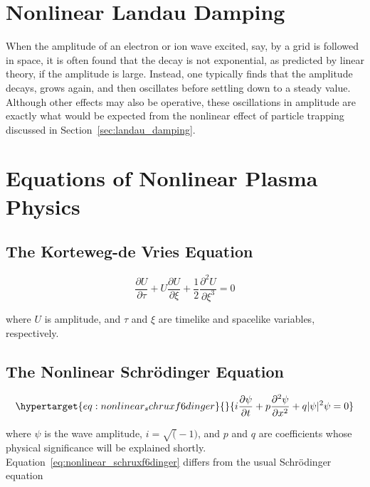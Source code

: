 \documentclass[
  notoc %
]{tufte-book}
\begin{document}
\hypertarget{nonlinear-landau-damping}{%
\section{Nonlinear Landau Damping}\label{nonlinear-landau-damping}}

When the amplitude of an electron or ion wave excited, say, by a grid is
followed in space, it is often found that the decay is not exponential,
as predicted by linear theory, if the amplitude is large. Instead, one
typically finds that the amplitude decays, grows again, and then
oscillates before settling down to a steady value. Although other
effects may also be operative, these oscillations in amplitude are
exactly what would be expected from the nonlinear effect of particle
trapping discussed in Section~\ref{sec:landau_damping}.

\hypertarget{equations-of-nonlinear-plasma-physics}{%
\section{Equations of Nonlinear Plasma
Physics}\label{equations-of-nonlinear-plasma-physics}}

\hypertarget{the-korteweg-de-vries-equation}{%
\subsection{The Korteweg-de Vries
Equation}\label{the-korteweg-de-vries-equation}}

\[
\frac{\partial U}{\partial\tau} + U\frac{\partial U}{\partial\xi}+\frac{1}{2}\frac{\partial^2 U}{\partial\xi^3} = 0
\]

where \(U\) is amplitude, and \(\tau\) and \(\xi\) are timelike and
spacelike variables, respectively.

\hypertarget{the-nonlinear-schruxf6dinger-equation}{%
\subsection{The Nonlinear Schrödinger
Equation}\label{the-nonlinear-schruxf6dinger-equation}}

\begin{equation}\protect\hypertarget{eq:nonlinear_schruxf6dinger}{}{
i\frac{\partial\psi}{\partial t} + p\frac{\partial^2\psi}{\partial x^2} + q|\psi|^2\psi = 0
}\label{eq:nonlinear_schruxf6dinger}\end{equation}

where \(\psi\) is the wave amplitude, \(i=\sqrt(-1)\), and \(p\) and
\(q\) are coefficients whose physical significance will be explained
shortly. Equation~\ref{eq:nonlinear_schruxf6dinger} differs from the
usual Schrödinger equation
\end{document}
